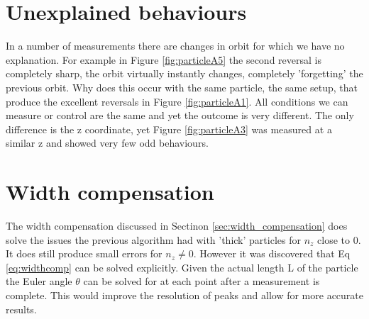 \section{Unexplained behaviours}
In a number of measurements there are changes in orbit for which we have no explanation. For example in Figure \ref{fig:particleA5} the second reversal is completely sharp, the orbit virtually instantly changes, completely 'forgetting' the previous orbit. Why does this occur with the same particle, the same setup, that produce the excellent reversals in Figure \ref{fig:particleA1}. All conditions we can measure or control are the same and yet the outcome is very different. The only difference is the z coordinate, yet Figure \ref{fig:particleA3} was measured at a similar z and showed very few odd behaviours. 

\section{Width compensation}
The width compensation discussed in Sectinon \ref{sec:width_compensation} does solve the issues the previous algorithm had with 'thick' particles for $n_z$ close to 0. It does still produce small errors for $n_z \neq 0$. However it was discovered that Eq \ref{eq:widthcomp} can be solved explicitly. Given the actual length L of the particle the Euler angle $\theta$ can be solved for at each point after a measurement is complete. This would improve the resolution of peaks and allow for more accurate results.
